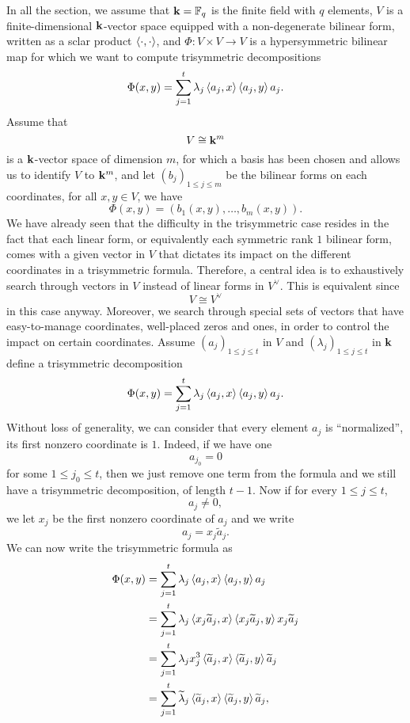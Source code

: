 In all the section, we assume that $\mathbf{k}=\mathbb{F}_q$ is the finite field with
$q$ elements, $V$ is a finite-dimensional $\mathbf{k}$-vector space equipped with a
non-degenerate bilinear form, written as a sclar product $\left\langle\cdot,\cdot\right\rangle$,
and $\Phi:V\times V\to V$ is a hypersymmetric bilinear map for which we want to
compute trisymmetric decompositions
\[
  \Phi(x, y) = \sum_{j=1}^t\lambda_j\left\langle a_j,x\right\rangle\left\langle a_j,y\right\rangle a_j.
\]
Assume that
\[
  V\cong\mathbf{k}^m
\]
is a $\mathbf{k}$-vector space of dimension $m$, for which a basis has been chosen and
allows us to identify $V$ to $\mathbf{k}^m$, and
let $(b_j)_{1\leq j\leq m}$ be the bilinear forms on each coordinates, \ie for
all $x,y\in V$, we have
\[
  \Phi(x, y) = (b_1(x, y), \dots, b_m(x, y)).
\]
We have already seen that the difficulty in the trisymmetric case resides in the
fact that each linear form, or equivalently each symmetric rank $1$ bilinear
form, comes with a given vector in $V$ that dictates its impact on the different
coordinates in a trisymmetric formula. Therefore, a central idea is to
exhaustively search through vectors in $V$ instead of linear forms in $V^\vee$.
This is equivalent since 
\[
  V\cong V^\vee
\]
in this case anyway. Moreover, we search through special sets of vectors that
have easy-to-manage coordinates, \eg well-placed zeros and ones, in order to
control the impact on certain coordinates. Assume $(a_j)_{1\leq j \leq t}$ in $V$ and
$(\lambda_j)_{1\leq j \leq t}$ in $\mathbf{k}$ define a trisymmetric decomposition
\[
  \Phi(x, y) = \sum_{j=1}^t\lambda_j\left\langle a_j,x\right\rangle\left\langle a_j,y\right\rangle a_j.
\]
Without loss of generality, we can consider that every element $a_j$ is
``normalized'', \ie its first nonzero coordinate is $1$. Indeed, if we have one
\[
  a_{j_0} = 0
\]
for some $1\leq j_0 \leq t$, then we just remove one term from the formula and
we still have a trisymmetric decomposition, of length $t-1$. Now if for every
$1\leq j\leq t$, 
\[
  a_j\neq0,
\]
we let $x_j$ be the first nonzero coordinate of $a_j$ and we write
\[
  a_j = x_j \widetilde a_j.
\]
We can now write the trisymmetric formula as
\begin{align*}
  \Phi(x, y) &= \sum_{j=1}^t\lambda_j\left\langle a_j,x\right\rangle\left\langle a_j,y\right\rangle a_j \\
  &= \sum_{j=1}^t\lambda_j\left\langle x_j\widetilde a_j,x\right\rangle\left\langle x_j\widetilde
  a_j,y\right\rangle x_j\widetilde a_j \\
  &= \sum_{j=1}^t\lambda_jx_j^3\left\langle\widetilde a_j,x\right\rangle\left\langle\widetilde
  a_j,y\right\rangle\widetilde a_j \\
  &= \sum_{j=1}^t\widetilde \lambda_j\left\langle\widetilde a_j,x\right\rangle\left\langle\widetilde
  a_j,y\right\rangle\widetilde a_j,
\end{align*}
